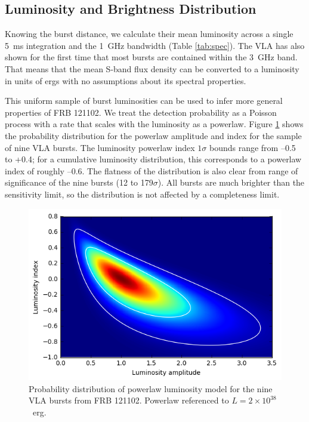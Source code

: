 \documentclass[twocolumn]{aastex61}
\newcommand{\frb}{FRB 121102}
\begin{document}
\subsection{Luminosity and Brightness Distribution}
\label{sec:disn}
Knowing the burst distance, we calculate their mean luminosity across a single 5~ms integration and the 1~GHz bandwidth (Table \ref{tab:spec}). The VLA has also shown for the first time that most bursts are contained within the 3~GHz band. That means that the mean S-band flux density can be converted to a luminosity in units of ergs with no assumptions about its spectral properties.

This uniform sample of burst luminosities can be used to infer more general properties of \frb. We treat the detection probability as a Poisson process with a rate that scales with the luminosity as a powerlaw. Figure \ref{fig:lumd} shows the probability distribution for the powerlaw amplitude and index for the sample of nine VLA bursts. The luminosity powerlaw index $1\sigma$ bounds range from --0.5 to +0.4; for a cumulative luminosity distribution, this corresponds to a powerlaw index of roughly --0.6. The flatness of the distribution is also clear from range of significance of the nine bursts (12 to 179$\sigma$). All bursts are much brighter than the sensitivity limit, so the distribution is not affected by a completeness limit.

\begin{figure}[htb]
\begin{center}
\includegraphics[width=0.9\columnwidth]{luminosity_disn}
\caption{Probability distribution of powerlaw luminosity model for the nine VLA bursts from \frb. Powerlaw referenced to $L=2\times10^{38}$\ erg.
\label{fig:lumd}}
\end{center}
\end{figure}
\end{document}
